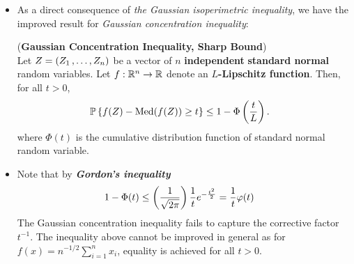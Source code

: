\documentclass[11pt]{article}
\begin{document}
\begin{itemize}
\item As a direct consequence of \emph{the Gaussian isoperimetric inequality}, we have the improved result for \emph{Gaussian concentration inequality}:
 \begin{theorem}  (\textbf{Gaussian Concentration Inequality, Sharp Bound}) \citep{boucheron2013concentration, wainwright2019high} \\
Let $Z = (Z_1 \,{,}\ldots{,}\, Z_n)$ be a vector of $n$ \textbf{independent} \textbf{standard normal} random variables. Let $f : {\mathbb R}^n \to {\mathbb R}$ denote an \textbf{$L$-Lipschitz function}. Then, for all $t > 0$, 
\begin{align}
{\mathbb P}\left\{f(Z) - \text{Med}(f(Z)) \ge t \right\} &\le 1 - \Phi\left(\frac{t}{L}\right). \label{ineqn: gaussian_concentration_inequality_improved}
\end{align} where $\Phi(t)$ is the cumulative distribution function of standard normal random variable.
\end{theorem}

\item \begin{remark}
Note that by \emph{\textbf{Gordon's inequality}}
\begin{align*}
1 - \Phi(t) &\le \left(\frac{1}{\sqrt{2\pi}}\right)\frac{1}{t} e^{-\frac{t^2}{2}} = \frac{1}{t}\varphi(t)
\end{align*} The Gaussian concentration inequality fails to capture the corrective factor $t^{-1}$. The inequality above cannot be improved in general as for $f(x) = n^{-1/2}\sum_{i=1}^n x_i$, equality is achieved for all $t > 0$.
\end{remark}
\end{itemize}
\end{document}
